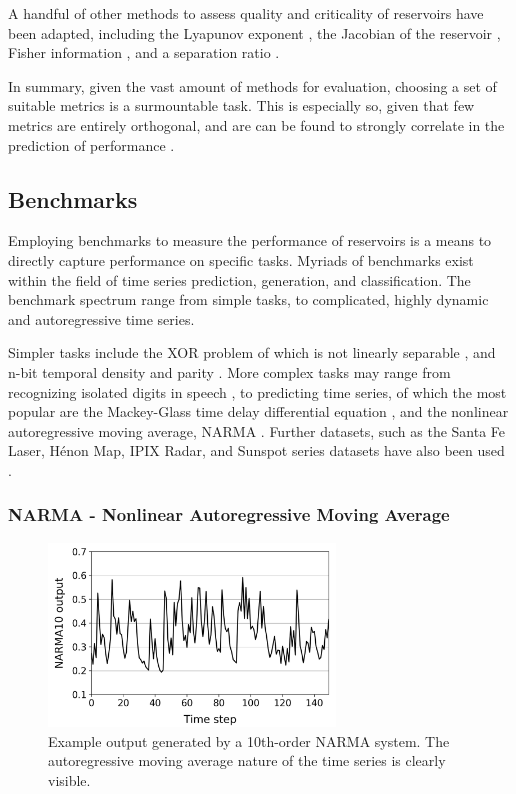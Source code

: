 A handful of other methods to assess quality and criticality of reservoirs have
been adapted, including the Lyapunov exponent
\cite{verstraeten_experimental_2007}, the Jacobian of the reservoir
\cite{alippi_quantification_2009}, Fisher information
\cite{livi_determination_2018}, and a separation ratio
\cite{gibbons_unifying_2010}.

In summary, given the vast amount of methods for evaluation, choosing a set of
suitable metrics is a surmountable task. This is especially so, given that few
metrics are entirely orthogonal, and are can be found to strongly correlate in
the prediction of performance \cite{chrol-cannon_correlation_2014}.

\subsection{Benchmarks}

Employing benchmarks to measure the performance of reservoirs is a means to
directly capture performance on specific tasks. Myriads of benchmarks exist
within the field of time series prediction, generation, and classification. The
benchmark spectrum range from simple tasks, to complicated, highly dynamic and
autoregressive time series.

Simpler tasks include the XOR problem of which is not linearly separable
\cite{goos_pattern_2003}, and n-bit temporal density and parity
\cite{bertschinger_real-time_2004}. More complex tasks may range from
recognizing isolated digits in speech \cite{verstraeten_isolated_2005}, to
predicting time series, of which the most popular are the Mackey-Glass time
delay differential equation \cite{mackey_oscillation_1977}, and the nonlinear
autoregressive moving average, NARMA \cite{atiya_new_2000}. Further datasets,
such as the Santa Fe Laser, Hénon Map, IPIX Radar, and Sunspot series datasets
have also been used \cite{rodan_minimum_2011}.

\subsubsection{NARMA - Nonlinear Autoregressive Moving Average}

\begin{figure}[t!]
  \centering
  \includegraphics[width=3.0in]{figures/NARMA10.png}
  \caption{
    Example output generated by a 10th-order NARMA system. The autoregressive
moving average nature of the time series is clearly visible.
  }
  \label{fig:narma10}
\end{figure}

